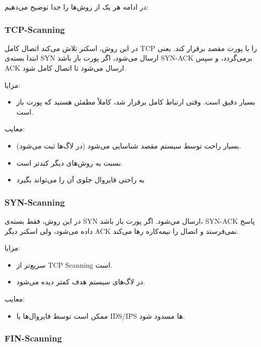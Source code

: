 در ادامه هر یک از روش‌ها را جدا توضیح می‌دهیم:

\subsubsection*{TCP-Scanning}

در این روش، اسکنر تلاش می‌کند اتصال کامل TCP را با پورت مقصد برقرار کند. یعنی ابتدا بسته‌ی SYN ارسال می‌شود، اگر پورت باز باشد SYN-ACK برمی‌گردد، و سپس ACK ارسال می‌شود تا اتصال کامل شود.

مزایا:
\begin{itemize}
    \item بسیار دقیق است. وقتی ارتباط کامل برقرار شد، کاملاً مطمئن هستید که پورت باز است.
\end{itemize}

معایب:
\begin{itemize}
    \item بسیار راحت توسط سیستم مقصد شناسایی می‌شود (در لاگ‌ها ثبت می‌شود).
    \item نسبت به روش‌های دیگر کندتر است.
    \item به راحتی فایروال جلوی آن را می‌تواند بگیرد
\end{itemize}

\subsubsection*{SYN-Scanning}

در این روش، فقط بسته‌ی SYN ارسال می‌شود. اگر پورت باز باشد، SYN-ACK پاسخ داده می‌شود، ولی اسکنر دیگر ACK نمی‌فرستد و اتصال را نیمه‌کاره رها می‌کند.

مزایا:

\begin{itemize}
    \item سریع‌تر از TCP Scanning است.
    \item در لاگ‌های سیستم هدف کمتر دیده می‌شود.
\end{itemize}

معایب:

\begin{itemize}
    \item ممکن است توسط فایروال‌ها یا IDS/IPS ها مسدود شود.
\end{itemize}


\subsubsection*{FIN-Scanning}

